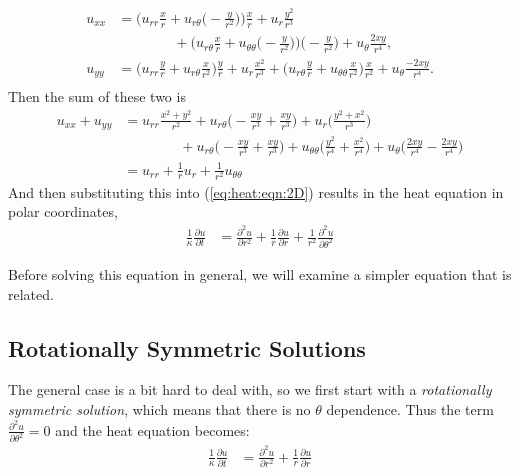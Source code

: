 %
\begin{align*}
u_{xx} & = \biggl(u_{rr} \frac{x}{r} + u_{r\theta} \biggl(-\frac{y}{r^2} \biggr) \biggr)\frac{x}{r} + u_r \frac{y^2}{r^3} \\
& \qquad \qquad + \biggl(u_{r\theta}\frac{x}{r} + u_{\theta\theta}\biggl(-\frac{y}{r^2} \biggr) \biggr)\biggl(-\frac{y}{r^2} \biggr) + u_{\theta}\frac{2xy}{r^4},   \\
u_{yy} & = \biggl(u_{rr} \frac{y}{r} + u_{r\theta} \frac{x}{r^2} \biggr)\frac{y}{r} + u_r \frac{x^2}{r^3} + \biggl(u_{r \theta}\frac{y}{r} + u_{\theta\theta} \frac{x}{r^2} \biggr) \frac{x}{r^2} + u_{\theta}\frac{-2xy}{r^4}. \\
\end{align*}
Then the sum of these two is
\begin{align*}
u_{xx}+u_{yy} & = u_{rr} \frac{x^2+y^2}{r^2} + u_{r\theta} \biggl(-\frac{xy}{r^3} + \frac{xy}{r^3} \biggr) + u_r \biggl( \frac{y^2+x^2}{r^3}\biggr) \\
& \qquad \qquad  + u_{r \theta} \biggl(-\frac{xy}{r^3} + \frac{xy}{r^3} \biggr) + u_{\theta \theta}\biggl(\frac{y^2}{r^4} + \frac{x^2}{r^4} \biggr) + u_{\theta} \biggl( \frac{2xy}{r^4} - \frac{2xy}{r^4} \biggr) \\
& = u_{rr} + \frac{1}{r} u_r + \frac{1}{r^2} u_{\theta\theta}
\end{align*}
And then substituting this into (\ref{eq:heat:eqn:2D}) results in the heat equation in polar coordinates,
%
\begin{align}
\frac{1}{\kappa} \frac{\partial u}{\partial t} & = \frac{\partial^2 u}{\partial {r}^2}  + \frac{1}{r} \frac{\partial u}{\partial r}+ \frac{1}{r^2} \frac{\partial^2 u}{\partial {\theta}^2}   \label{eq:heat:eqn:polar}
\end{align}

Before solving this equation in general, we will examine a simpler equation that is related.

\subsection{Rotationally Symmetric Solutions}

The general case is a bit hard to deal with, so we first start with a \emph{rotationally symmetric solution}, which means that there is no $\theta$ dependence.  Thus the term $ \frac{\partial^2 u}{\partial {\theta}^2} =0$ and the heat equation becomes:
%
\begin{align} \label{eq:heat:rot:sym}
\frac{1}{\kappa} \frac{\partial u}{\partial t} & = \frac{\partial^2 u}{\partial {r}^2}  + \frac{1}{r} \frac{\partial u}{\partial r}
\end{align}

